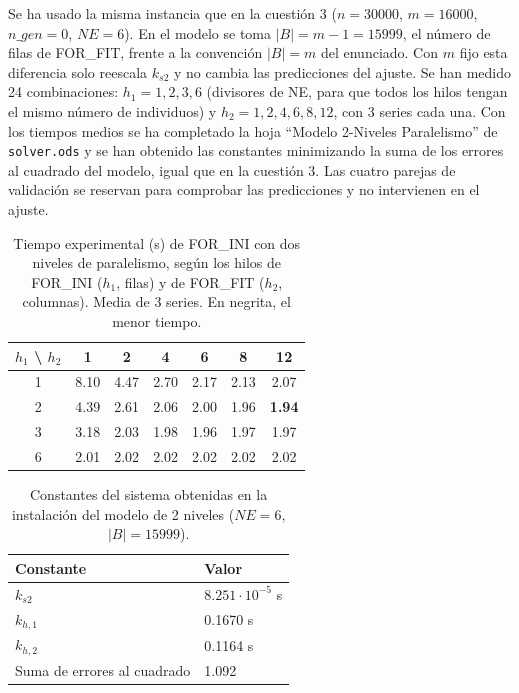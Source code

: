 \documentclass[12pt]{article}
\begin{document}
\begin{enumerate}
Se ha usado la misma instancia que en la cuestión 3 ($n = 30000$, $m = 16000$, $n\_gen = 0$, $NE = 6$). En el modelo se toma $|B| = m-1 = 15999$, el número de filas de FOR\_FIT, frente a la convención $|B| = m$ del enunciado. Con $m$ fijo esta diferencia solo reescala $k_{s2}$ y no cambia las predicciones del ajuste. Se han medido 24 combinaciones: $h_1 = 1, 2, 3, 6$ (divisores de NE, para que todos los hilos tengan el mismo número de individuos) y $h_2 = 1, 2, 4, 6, 8, 12$, con 3 series cada una. Con los tiempos medios se ha completado la hoja ``Modelo 2-Niveles Paralelismo'' de \texttt{solver.ods} y se han obtenido las constantes minimizando la suma de los errores al cuadrado del modelo, igual que en la cuestión 3. Las cuatro parejas de validación se reservan para comprobar las predicciones y no intervienen en el ajuste.

\begin{table}[htbp]
\centering
\begin{tabular}{c|cccccc}
\toprule
\textbf{$h_1$ \textbackslash{} $h_2$} & \textbf{1} & \textbf{2} & \textbf{4} & \textbf{6} & \textbf{8} & \textbf{12} \\
\midrule
1 & 8.10 & 4.47 & 2.70 & 2.17 & 2.13 & 2.07 \\
2 & 4.39 & 2.61 & 2.06 & 2.00 & 1.96 & \textbf{1.94} \\
3 & 3.18 & 2.03 & 1.98 & 1.96 & 1.97 & 1.97 \\
6 & 2.01 & 2.02 & 2.02 & 2.02 & 2.02 & 2.02 \\
\bottomrule
\end{tabular}
\caption{Tiempo experimental (s) de FOR\_INI con dos niveles de paralelismo, según los hilos de FOR\_INI ($h_1$, filas) y de FOR\_FIT ($h_2$, columnas). Media de 3 series. En negrita, el menor tiempo.}
\label{tab:c4_tiempos}
\end{table}

\begin{table}[htbp]
\centering
\begin{tabular}{ll}
\toprule
\textbf{Constante} & \textbf{Valor} \\
\midrule
$k_{s2}$ & $8.251 \cdot 10^{-5}$ s \\
$k_{h,1}$ & 0.1670 s \\
$k_{h,2}$ & 0.1164 s \\
Suma de errores al cuadrado & 1.092 \\
\bottomrule
\end{tabular}
\caption{Constantes del sistema obtenidas en la instalación del modelo de 2 niveles ($NE = 6$, $|B| = 15999$).}
\label{tab:c4_constantes}
\end{table}


\end{enumerate}
\end{document}
